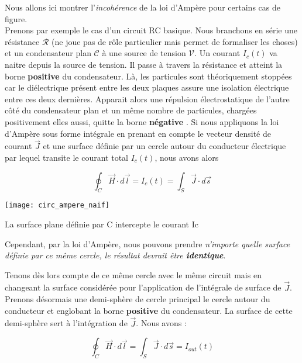 Nous allons ici montrer l'\textit{incohérence} de la loi d'Ampère pour certains cas de figure. \\
Prenons par exemple  le cas d'un circuit RC basique. Nous branchons en série une résistance $\mathcal{R}$ (ne joue pas de rôle particulier mais permet de formaliser les choses) et un condensateur plan $\mathcal{C}$ à une source de tension $\mathcal{V}$. Un courant $I_{c}(t)$ va naitre depuis la source de tension. Il passe à travers la résistance et atteint la borne \textbf{positive} du condensateur. Là, les particules sont théoriquement stoppées car le diélectrique présent entre les deux plaques assure une isolation électrique entre ces deux dernières. Apparait alors une répulsion électrostatique de l'autre côté du condensateur plan  et un même nombre de particules, chargées positivement elles aussi, quitte la borne \textbf{négative} . Si nous appliquons la loi d'Ampère sous forme intégrale en prenant en compte le vecteur densité de courant $\vec{J}$ et une surface définie par un cercle autour du conducteur électrique par lequel transite le courant total $I_{c}(t)$, nous avons alors 

\[  \oint_{C} \vec{H} \cdot d\vec{l} = I_{c}(t) = \int_{S} \vec{J} \cdot d\vec{s} \]

\begin{marginfigure}[0cm]
	\texttt{[image: circ\_ampere\_naif]}
	\caption{La surface plane définie par C intercepte le courant Ic}
\end{marginfigure}

Cependant, par la loi d'Ampère, nous pouvons prendre \textit{n'importe quelle surface définie par ce même cercle, le résultat devrait être \textbf{identique}}.

Tenons dès lors compte de ce même cercle avec le même circuit mais en changeant la surface considérée pour l'application de l'intégrale de surface de $\vec{J}$. 
Prenons désormais une demi-sphère de cercle principal le cercle autour du conducteur et englobant la borne \textbf{positive} du condensateur. La surface de cette demi-sphère sert
à l'intégration de $\vec{J}$. Nous avons : 

\[  \oint_{C} \vec{H} \cdot d\vec{l} =  \int_{S} \vec{J} \cdot d\vec{s} = I_{out}(t)\] 

